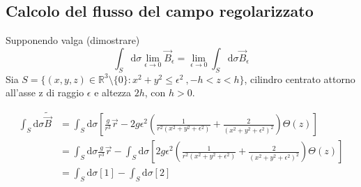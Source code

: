 \subsection{Calcolo del flusso del campo regolarizzato}
\label{sec:flusso_regolarizzato}
Supponendo valga (dimostrare)
$$
  \int_S \mathrm{d}\sigma \lim_{\epsilon \to 0} \vec B_\epsilon = \lim_{\epsilon \to 0} \int_S \mathrm{d}\sigma \vec B_\epsilon
$$
Sia $S = \{(x,y,z) \in \mathbb{R}^3 \setminus \{0\} : x^2 + y^2 \leq \epsilon ^2\ ,-h<z<h\}$,
cilindro centrato attorno all'asse z di raggio $\epsilon$ e altezza $2h$, con $h>0$.

\begin{equation*}
   \begin{split}
      \int_S \mathrm{d}\sigma \tilde{\vec B}  &= \int_S \mathrm{d}\sigma \left[\frac{g}{r^3}\vec r
         - 2g\epsilon^2 \left( \frac{1}{r^2(x^2 + y^2 + \epsilon^2)}
               + \frac{2}{(x^2 + y^2 + \epsilon^2)^2}\right) \Theta(z)  \right] \\
         &= \int_S \mathrm{d}\sigma \frac{g}{r^3}\vec r
            - \int_S \mathrm{d}\sigma \left[ 2g\epsilon^2 \left( \frac{1}{r^2(x^2 + y^2 + \epsilon^2)}
                  + \frac{2}{(x^2 + y^2 + \epsilon^2)^2}\right) \Theta(z) \right] \\
          &= \int_S \mathrm{d}\sigma [1] - \int_S \mathrm{d}\sigma [2]
   \end{split}
\end{equation*}

